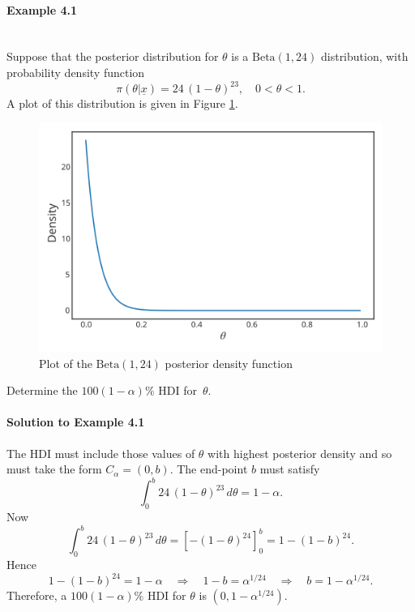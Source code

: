 \paragraph{Example 4.1}{~\\
Suppose that the posterior distribution for $\theta$ is a
$\text{Beta}(1,24)$ distribution, with probability density function
$$
\pi(\theta|\underline{x})=24\,(1-\theta)^{23}, \quad 0<\theta<1.
$$
A plot of this distribution is given in Figure \ref{fig:ci1}.
\begin{figure}[h!]

\includegraphics{images/betaposterior.svg}
\caption{Plot of the $\text{Beta}(1,24)$ posterior density function}
\label{fig:ci1}

\end{figure}
Determine the $100(1-\alpha)\%$ HDI for~$\theta$.

\newpage

\paragraph{Solution to Example 4.1}{
    
    The HDI must include those values of $\theta$ with highest
    posterior density and so must take the form $C_\alpha=(0,b)$. The
    end-point $b$ must satisfy
    \begin{equation*}
    \int_0^b 24\,(1-\theta)^{23}\,d\theta = 1-\alpha.
    \end{equation*}
    Now
    \begin{equation*}
    \int_0^b 24\,(1-\theta)^{23}\,d\theta 
    = \left[-(1-\theta)^{24}\right]^b_0 = 1-(1-b)^{24}.
    \end{equation*}
    Hence
    $$
    1-(1-b)^{24}=1-\alpha \quad\Longrightarrow \quad 1-b=\alpha^{1/24}
    \quad\Longrightarrow \quad b=1-\alpha^{1/24}.
    $$
    Therefore, a $100(1-\alpha)\%$ HDI for $\theta$ is
    $(0,1-\alpha^{1/24})$. 
    
    
}}

